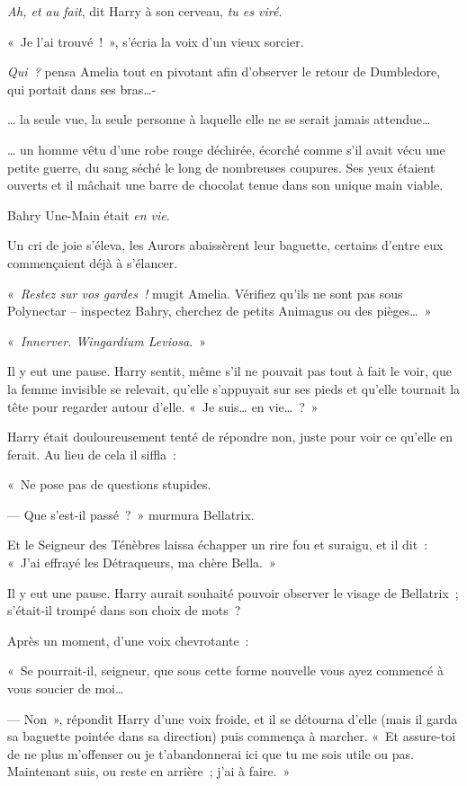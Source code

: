 \emph{Ah, et au fait}, dit Harry à son cerveau, \emph{tu es viré}.

\later

«~Je l'ai trouvé~!~», s'écria la voix d'un vieux sorcier.

\emph{Qui~?} pensa Amelia tout en pivotant afin d'observer le retour de Dumbledore, qui portait dans ses bras…-

… la seule vue, la seule personne à laquelle elle ne se serait jamais attendue…

… un homme vêtu d'une robe rouge déchirée, écorché comme s'il avait vécu une petite guerre, du sang séché le long de nombreuses coupures. Ses yeux étaient ouverts et il mâchait une barre de chocolat tenue dans son unique main viable.

Bahry Une-Main était \emph{en vie}.

Un cri de joie s'éleva, les Aurors abaissèrent leur baguette, certains d'entre eux commençaient déjà à s'élancer.

«~\emph{Restez sur vos gardes~!} mugit Amelia. Vérifiez qu'ils ne sont pas sous Polynectar -- inspectez Bahry, cherchez de petits Animagus ou des pièges…~»

\later

«~\emph{Innerver. Wingardium Leviosa.}~»

Il y eut une pause. Harry sentit, même s'il ne pouvait pas tout à fait le voir, que la femme invisible se relevait, qu'elle s'appuyait sur ses pieds et qu'elle tournait la tête pour regarder autour d'elle. «~Je suis… en vie…~?~»

Harry était douloureusement tenté de répondre non, juste pour voir ce qu'elle en ferait. Au lieu de cela il siffla~:

«~Ne pose pas de questions stupides.

--- Que s'est-il passé~?~» murmura Bellatrix.

Et le Seigneur des Ténèbres laissa échapper un rire fou et suraigu, et il dit~: «~J'ai effrayé les Détraqueurs, ma chère Bella.~»

Il y eut une pause. Harry aurait souhaité pouvoir observer le visage de Bellatrix~; s'était-il trompé dans son choix de mots~?

Après un moment, d'une voix chevrotante~:

«~Se pourrait-il, seigneur, que sous cette forme nouvelle vous ayez commencé à vous soucier de moi…

--- Non~», répondit Harry d'une voix froide, et il se détourna d'elle (mais il garda sa baguette pointée dans sa direction) puis commença à marcher. «~Et assure-toi de ne plus m'offenser ou je t'abandonnerai ici que tu me sois utile ou pas. Maintenant suis, ou reste en arrière~; j'ai à faire.~»

